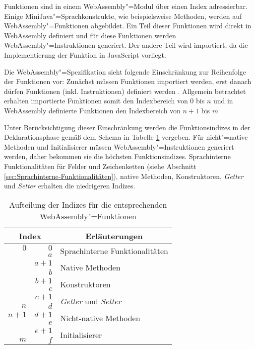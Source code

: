 Funktionen sind in einem WebAssembly"=Modul über einen Index adressierbar. Einige MiniJava"=Sprachkonstrukte, wie beispielsweise Methoden, werden auf WebAssembly"=Funktionen abgebildet. Ein Teil dieser Funktionen wird direkt in WebAssembly definiert und für diese Funktionen werden WebAssembly"=Instruktionen generiert. Der andere Teil wird importiert, da die Implementierung der Funktion in JavaScript vorliegt.

Die WebAssembly"=Spezifikation sieht folgende Einschränkung zur Reihenfolge der Funktionen vor: Zunächst müssen Funktionen importiert werden, erst danach dürfen Funktionen (inkl. Instruktionen) definiert werden \cite{WebAssemblySpecification}. Allgemein betrachtet erhalten importierte Funktionen somit den Indexbereich von $0$ bis $n$ und in WebAssembly definierte Funktionen den Indexbereich von $n+1$ bis $m$ 

Unter Berücksichtigung dieser Einschränkung werden die Funktionsindizes in der Deklarationsphase gemäß dem Schema in Tabelle \ref{tab:functionIndices} vergeben. Für nicht"=native Methoden und Initialisierer müssen WebAssembly"=Instruktionen generiert werden, daher bekommen sie die höchsten Funktionsindizes. Sprachinterne Funktionalitäten für Felder und Zeichenketten (siehe Abschnitt \ref{sec:Sprachinterne-Funktionalitäten}), native Methoden, Konstruktoren, \emph{Getter} und \emph{Setter} erhalten die niedrigeren Indizes.

\begin{table}[b]
    \centering
    \begin{tabular}{| r | r | l |}
        \hline
        \multicolumn{2}{|c|}{Index} & \multicolumn{1}{|c|}{Erläuterungen} \\
        \hline
        \hline
        $0$ & $0$ & \multirow{2}{*}{Sprachinterne Funktionalitäten} \\
        & $a$ & \\
        \hline
        & $a+1$ & \multirow{2}{*}{Native Methoden} \\
        & $b$ & \\
        \hline
        & $b+1$ & \multirow{2}{*}{Konstruktoren} \\
        & $c$ & \\
        \hline
        & $c+1$ & \multirow{2}{*}{\emph{Getter} und \emph{Setter}} \\
        $n$ & $d$ & \\
        \hline \hline
        $n+1$ & $d+1$ & \multirow{2}{*}{Nicht-native Methoden} \\
        & $e$ & \\
        \hline
        & $e+1$ & \multirow{2}{*}{Initialisierer} \\
        $m$ & $f$ & \\
        \hline
    \end{tabular}
    \caption{Aufteilung der Indizes für die entsprechenden WebAssembly"=Funktionen}
    \label{tab:functionIndices}
\end{table}

